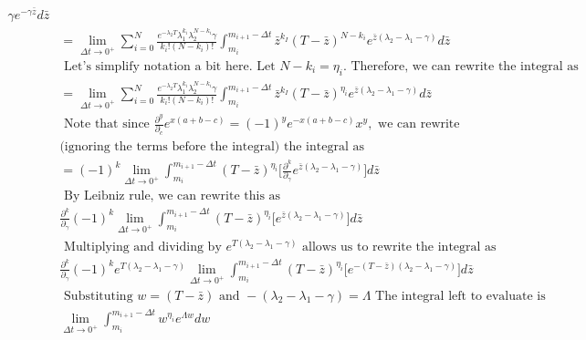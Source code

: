 \documentclass{article}
\begin{document}
\begin{align}
                  \gamma e^{-\gamma\bar{z}} d\bar{z} \nonumber \\
& = \lim_{\Delta t \to 0^+}  \sum_{i=0}^N \frac{e^{-\lambda_2 T}\lambda_1^{k_i}\lambda_2^{N-k_i} \gamma}{k_i!(N-k_i)!}
                 \int_{m_i}^{m_{i+1}-\Delta t}  \bar{z}^{k_I} (T- \bar{z})^{N-k_i}
                 e^{\bar{z}(\lambda_2 -\lambda_1 -\gamma)}
                  d\bar{z} \nonumber \\
& \text{ Let's simplify notation a bit here.   Let } N-k_i = \eta_i.  \text{ Therefore, we can rewrite the integral as} \nonumber \\
& = \lim_{\Delta t \to 0^+}  \sum_{i=0}^N \frac{e^{-\lambda_2 T}\lambda_1^{k_i}\lambda_2^{N-k_i} \gamma}{k_i!(N-k_i)!}
                 \int_{m_i}^{m_{i+1}-\Delta t}  \bar{z}^{k_I} (T- \bar{z})^{\eta_i}
                 e^{\bar{z}(\lambda_2 -\lambda_1 -\gamma)}
                  d\bar{z} \nonumber \\
& \text{ Note that since }\frac{\partial^y}{\partial_c}e^{x(a+b-c)} = (-1)^ye^{-x(a+b-c)}x^y, \text{  we can rewrite } \nonumber \\
&\text {(ignoring the terms before the integral) the integral as } \nonumber \\
& = (-1)^k\lim_{\Delta t \to 0^+} \int_{m_i}^{m_{i+1}-\Delta t}   (T- \bar{z})^{\eta_i}
                 \big[\frac{\partial^k}{\partial_{\gamma}}e^{\bar{z}(\lambda_2 -\lambda_1 -\gamma)}\big]d\bar{z} \nonumber \\
& \text{ By Leibniz rule, we can rewrite this as } \nonumber \\
& \frac{\partial^k}{\partial_{\gamma}}(-1)^k\lim_{\Delta t \to 0^+} \int_{m_i}^{m_{i+1}-\Delta t}   (T- \bar{z})^{\eta_i}
                 \big[e^{\bar{z}(\lambda_2 -\lambda_1 -\gamma)}\big]d\bar{z} \nonumber \\
& \text{ Multiplying and dividing by } e^{T(\lambda_2-\lambda_1-\gamma)} \text{  allows us to rewrite the integral as } \nonumber \\
& \frac{\partial^k}{\partial_{\gamma}}(-1)^ke^{T(\lambda_2 -\lambda_1 -\gamma)}
                 \lim_{\Delta t \to 0^+} \int_{m_i}^{m_{i+1}-\Delta t}   (T- \bar{z})^{\eta_i}
                 \big[e^{-(T-\bar{z})(\lambda_2 -\lambda_1 -\gamma)}\big]d\bar{z} \nonumber \\
& \text{ Substituting } w = (T-\bar{z}) \text{ and }  - (\lambda_2 -\lambda_1 -\gamma) = \Lambda \text{  The integral left to evaluate is } \nonumber \\
&  \lim_{\Delta t \to 0^+} \int_{m_i}^{m_{i+1}-\Delta t}   w^{\eta_i}e^{\Lambda w}dw \nonumber \\
\end{align}
\end{document}
